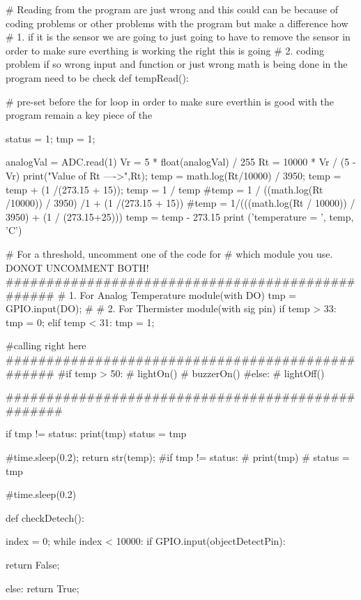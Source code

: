 # Reading from the program are just wrong and this could can be because of coding problems or other problems with the program but make a difference how
# 1. if it is the sensor we are going to just going to have to remove the sensor in order to make sure everthing is working the right this is going
# 2. coding problem if so wrong input and function or just wrong math is being done in the program need to be check 
def tempRead(): 
	
		# pre-set before the for loop in order to make sure everthin is good with the program remain a key piece of the 
		
		status = 1;
		tmp = 1;
		
		
		analogVal = ADC.read(1)
		Vr = 5 * float(analogVal) / 255
		Rt = 10000 * Vr / (5 - Vr)
		print("Value of Rt ---->",Rt);
		temp = math.log(Rt/10000) / 3950;
		temp = temp + (1 /(273.15 + 15));
		temp = 1 / temp
		#temp = 1 / ((math.log(Rt /10000)) / 3950) /1  + (1 /(273.15 + 15))
		#temp = 1/(((math.log(Rt / 10000)) / 3950) + (1 / (273.15+25)))
		temp = temp - 273.15
		print ('temperature = ', temp, 'C')

		# For a threshold, uncomment one of the code for
		# which module you use. DONOT UNCOMMENT BOTH!
		#################################################
		# 1. For Analog Temperature module(with DO)
		tmp = GPIO.input(DO);
		# 
		# 2. For Thermister module(with sig pin)
		if temp > 33:
			tmp = 0;
		elif temp < 31:
			tmp = 1;
		
		
		
		#calling right here
		#################################################
		#if temp > 50:
		#	lightOn()
		#	buzzerOn()
		#else:
		#	lightOff()
		
		##################################################
		
		
		
		
		
		
			
		
		if tmp != status: 
			print(tmp)
			status = tmp
			
		#time.sleep(0.2);
		return str(temp);
		#if tmp != status:
		#	print(tmp)
		#	status = tmp

		#time.sleep(0.2)

	

def checkDetech():
	
	
	index = 0;
	while index < 10000: 
		if GPIO.input(objectDetectPin): 
			
			return False; 
			
		else: 
			return True;
	
